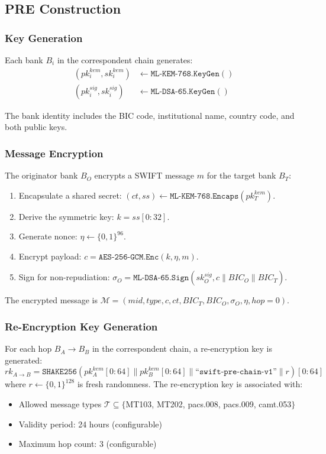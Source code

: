 \documentclass[conference,10pt]{IEEEtran}
\newcommand{\SHAKE}{\texttt{SHAKE256}}
\begin{document}
\subsection{PRE Construction}

\subsubsection{Key Generation}
Each bank $B_i$ in the correspondent chain generates:
\begin{align}
(pk_i^{kem}, sk_i^{kem}) &\leftarrow \texttt{ML-KEM-768.KeyGen}() \\
(pk_i^{sig}, sk_i^{sig}) &\leftarrow \texttt{ML-DSA-65.KeyGen}()
\end{align}

The bank identity includes the BIC code, institutional name, country code, and both public keys.

\subsubsection{Message Encryption}
The originator bank $B_O$ encrypts a SWIFT message $m$ for the target bank $B_T$:
\begin{enumerate}
\item Encapsulate a shared secret: $(ct, ss) \leftarrow \texttt{ML-KEM-768.Encaps}(pk_T^{kem})$.
\item Derive the symmetric key: $k = ss[0{:}32]$.
\item Generate nonce: $\eta \leftarrow \{0,1\}^{96}$.
\item Encrypt payload: $c = \texttt{AES-256-GCM.Enc}(k, \eta, m)$.
\item Sign for non-repudiation: $\sigma_O = \texttt{ML-DSA-65.Sign}(sk_O^{sig}, c \| BIC_O \| BIC_T)$.
\end{enumerate}

The encrypted message is $\mathcal{M} = (mid, type, c, ct, BIC_T, BIC_O, \sigma_O, \eta, hop{=}0)$.

\subsubsection{Re-Encryption Key Generation}
For each hop $B_A \to B_B$ in the correspondent chain, a re-encryption key is generated:
\begin{equation}
rk_{A \to B} = \SHAKE\!\left(pk_A^{kem}[0{:}64] \| pk_B^{kem}[0{:}64] \| \texttt{``swift-pre-chain-v1''} \| r\right)[0{:}64]
\end{equation}
where $r \leftarrow \{0,1\}^{128}$ is fresh randomness. The re-encryption key is associated with:
\begin{itemize}
\item Allowed message types $\mathcal{T} \subseteq \{$MT103, MT202, pacs.008, pacs.009, camt.053$\}$
\item Validity period: 24 hours (configurable)
\item Maximum hop count: 3 (configurable)
\end{itemize}
\end{document}
